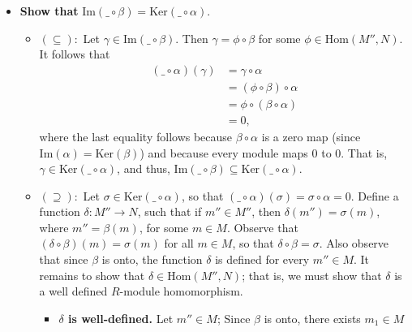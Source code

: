 \documentclass[9pt]{article}
\newcommand{\Ker}{\text{Ker}}
\newcommand{\im}{\text{Im}}
\begin{document}
\begin{enumerate}
      \begin{itemize}
         \item \textbf{Show that } $\im(\_\circ\beta) = \Ker(\_\circ\alpha)$.
               \begin{itemize}
                  \item $(\subseteq):$ Let $\gamma \in \im(\_\circ\beta)$. Then
                        $\gamma = \phi\circ\beta$ for some
                        $\phi \in \text{Hom}(M'', N)$. It follows that
                        \begin{align*}
                           (\_\circ\alpha)(\gamma) &= \gamma \circ \alpha \\
                              &= (\phi\circ\beta)\circ\alpha \\
                              &= \phi\circ(\beta\circ\alpha) \\
                              &= 0,
                        \end{align*}
                        where the last equality follows because
                        $\beta\circ\alpha$ is a zero map
                        (since $\im(\alpha) = \Ker(\beta)$) and because every
                        module maps 0 to 0. That is,
                        $\gamma \in \Ker(\_\circ\alpha)$, and thus,
                        $\im(\_\circ\beta) \subseteq \Ker(\_\circ\alpha)$.
                  \item $(\supseteq):$ Let $\sigma \in \Ker(\_\circ\alpha)$, so
                        that $(\_\circ\alpha)(\sigma) = \sigma\circ\alpha = 0$.
                        Define a function $\delta : M'' \rightarrow N$, such
                        that if $m'' \in M''$, then $\delta(m'') = \sigma(m)$,
                        where $m'' = \beta(m)$, for some $m \in M$. Observe that
                        $(\delta\circ\beta)(m) = \sigma(m)$ for all $m \in M$,
                        so that $\delta\circ\beta = \sigma$. Also observe that
                        since $\beta$ is onto, the function $\delta$ is defined for every
                        $m'' \in M$. It remains to show
                        that $\delta \in \text{Hom}(M'', N)$; that is, we must
                        show that $\delta$ is a well defined $R$-module
                        homomorphism.
                        \begin{itemize}
                           \item \textbf{$\delta$ is well-defined.} Let $m'' \in M$;
                                 Since $\beta$ is onto, there exists $m_1 \in M$

\end{itemize}
\end{itemize}
\end{itemize}
\end{enumerate}
\end{document}
